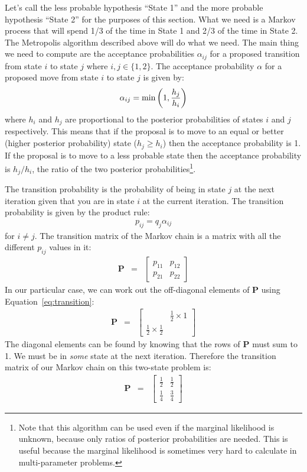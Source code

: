 Let's
call the less probable hypothesis ``State 1'' and the more probable hypothesis
``State 2'' for the purposes of this section.
What we need is a Markov process that will spend 1/3 of the time in State 1 and
2/3 of the time in State 2. The Metropolis algorithm described above will
do what we need. The main thing we need to compute are the acceptance probabilities
$\alpha_{ij}$ for a proposed transition from state $i$ to state $j$ where
$i, j \in \{1, 2\}$.
The acceptance probability $\alpha$ for a proposed move from state $i$ to
state $j$ is given by:
\begin{eqnarray}
\alpha_{ij} = \textnormal{min}\left(1, \frac{h_j}{h_i}\right)
\end{eqnarray}
where $h_i$ and $h_j$ are proportional to the posterior probabilities of
states $i$ and $j$ respectively. This means that if the proposal is to move
to an equal or better (higher posterior probability)
state ($h_j \geq h_i$) then the acceptance probability is 1.
If the proposal is to move to a less probable state then the acceptance probability
is $h_j/h_i$, the ratio of the two posterior probabilities\footnote{Note that
this algorithm can be used even if the marginal likelihood is unknown, because
only ratios of posterior probabilities are needed. This is useful because the
marginal likelihood is sometimes very hard to calculate in multi-parameter
problems.}.

The transition probability is the probability
of being in state $j$ at the next iteration given that you are in state $i$
at the current iteration. The transition probability is given by the product
rule:
\begin{eqnarray}
p_{ij} = q_j \alpha_{ij}\label{eq:transition}
\end{eqnarray}
for $i \neq j$.
The transition matrix of the Markov chain is a matrix with all the different
$p_{ij}$ values in it:
\begin{eqnarray}
\mathbf{P} &=&
\left[
\begin{array}{cc}
p_{11} & p_{12}\\
p_{21} & p_{22}
\end{array}
\right]
\end{eqnarray}
In our particular case, we can work out the off-diagonal elements of
$\mathbf{P}$ using Equation~\ref{eq:transition}:
\begin{eqnarray}
\mathbf{P}
&=&
\left[
\begin{array}{cc}
 & \frac{1}{2} \times 1\\
\frac{1}{2}\times\frac{1}{2} & 
\end{array}
\right]
\end{eqnarray}
The diagonal elements can be found by knowing that the rows of $\mathbf{P}$ must
sum to 1. We must be in {\it some} state at the next iteration. Therefore the
transition matrix of our Markov chain on this two-state problem is:
\begin{eqnarray}
\mathbf{P}
&=&
\left[
\begin{array}{cc}
\frac{1}{2} & \frac{1}{2}\\
\frac{1}{4} & \frac{3}{4}
\end{array}
\right]
\end{eqnarray}

